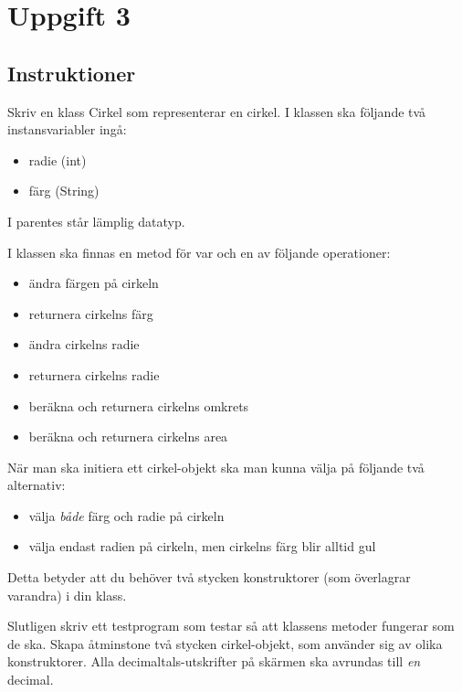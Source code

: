 \section{Uppgift 3}\label{sec:uppg03}

\subsection{Instruktioner}
Skriv en klass Cirkel som representerar en cirkel. I klassen ska följande
två instansvariabler ingå:

\begin{itemize}
\itemsep1pt\parskip0pt
\item radie (int)
\item färg (String)
\end{itemize}

I parentes står lämplig datatyp.

I klassen ska finnas en metod för var och en av följande operationer:

\begin{itemize}
\itemsep1pt\parskip0pt
\item ändra färgen på cirkeln
\item returnera cirkelns färg
\item ändra cirkelns radie
\item returnera cirkelns radie
\item beräkna och returnera cirkelns omkrets
\item beräkna och returnera cirkelns area
\end{itemize}


När man ska initiera ett cirkel-objekt ska man kunna välja på följande två
alternativ:

\begin{itemize}
\itemsep1pt\parskip0pt
\item välja \emph{både} färg och radie på cirkeln
\item välja endast radien på cirkeln, men cirkelns färg blir alltid gul
\end{itemize}

Detta betyder att du behöver två stycken konstruktorer (som överlagrar
varandra) i din klass.

Slutligen skriv ett testprogram som testar så att klassens metoder fungerar
som de ska.  Skapa åtminstone två stycken cirkel-objekt, som använder sig av
olika konstruktorer. Alla decimaltals-utskrifter på skärmen ska avrundas
till \emph{en} decimal.

